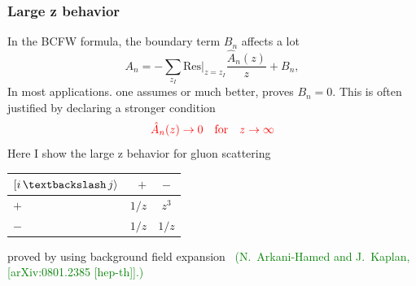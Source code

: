 \documentclass{beamer}
\begin{document}
\begin{frame}
    \frametitle{Large z behavior}
    In the BCFW formula, the boundary term $B_n$ affects a lot
    \begin{equation*}
        A_n=-\sum_{z_I}\mathrm{Res}|_{z=z_I}\frac{\hat{A}_n(z)}{z}+B_n,
    \end{equation*}
    In most applications. one assumes or much better, proves $B_n=0$. This is often justified by declaring a stronger condition
    \begin{equation*}
        \textcolor{red}{\hat{A}_n(z)\rightarrow 0 \quad \text{for} \quad z\rightarrow \infty} 
    \end{equation*}
    Here I show the large z behavior for gluon scattering 
    \begin{center}
        \begin{tabular}{lrc}
            \toprule
            $[i\, \textbackslash \, j\rangle $ & $+$ & $-$ \\
            \midrule
            $+$ & $1/z$ & $z^3$ \\
            $-$ & $1/z$ & $1/z$ \\
            \bottomrule
          \end{tabular}
    \end{center}
    proved by using background field expansion ~\textcolor{green}{(N.~Arkani-Hamed and J.~Kaplan,
[arXiv:0801.2385 [hep-th]].)}
\end{frame}
\end{document}
